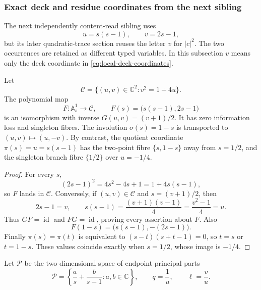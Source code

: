 \subsubsection{Exact deck and residue coordinates from the next sibling}

The next independently content-read sibling uses
\begin{equation}
 u=s(s-1),\qquad v=2s-1,
 \label{eq:local-deck-coordinates}
\end{equation}
but its later quadratic-trace section reuses the letter $v$ for $|c|^2$.  The two occurrences
are retained as different typed variables.  In this subsection $v$ means only the deck
coordinate in \eqref{eq:local-deck-coordinates}.

\begin{proposition}
\label{prop:local-deck-coordinate-isomorphism}
Let
\[
 \mathcal C=\{(u,v)\in\mathbb C^2:v^2=1+4u\}.
\]
The polynomial map
\[
 F:\mathbb A^1_s\longrightarrow\mathcal C,
 \qquad F(s)=\bigl(s(s-1),2s-1\bigr)
\]
is an isomorphism with inverse $G(u,v)=(v+1)/2$.  It has zero information loss and singleton
fibres.  The involution $\sigma(s)=1-s$ is transported to $(u,v)\mapsto(u,-v)$.  By contrast,
the quotient coordinate $\pi(s)=u=s(s-1)$ has the two-point fibre $\{s,1-s\}$ away from
$s=1/2$, and the singleton branch fibre $\{1/2\}$ over $u=-1/4$.
\end{proposition}
\begin{proof}
For every $s$,
\[
 (2s-1)^2=4s^2-4s+1=1+4s(s-1),
\]
so $F$ lands in $\mathcal C$.  Conversely, if $(u,v)\in\mathcal C$ and $s=(v+1)/2$, then
\[
 2s-1=v,
 \qquad
 s(s-1)=\frac{(v+1)(v-1)}4=\frac{v^2-1}4=u.
\]
Thus $GF=\operatorname{id}$ and $FG=\operatorname{id}$, proving every assertion about $F$.
Also
\[
 F(1-s)=\bigl(s(s-1),-(2s-1)\bigr).
\]
Finally $\pi(s)=\pi(t)$ is equivalent to
$(s-t)(s+t-1)=0$, so $t=s$ or $t=1-s$.  These values coincide exactly when $s=1/2$, whose
image is $-1/4$.
\end{proof}

Let $\mathcal P$ be the two-dimensional space of endpoint principal parts
\[
 \mathcal P=\left\{\frac a s+\frac b{s-1}:a,b\in\mathbb C\right\},
 \qquad
 q=\frac1u,
 \qquad
 \ell=\frac vu.
\]

